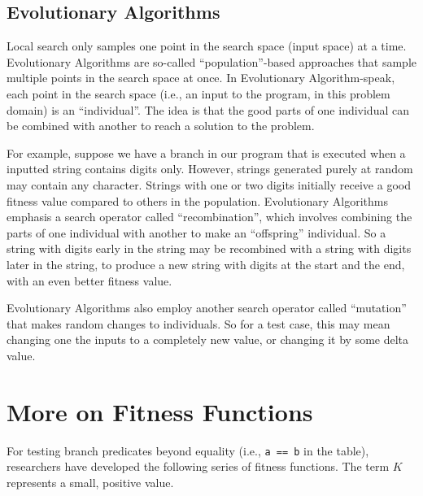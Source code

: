 \subsection{Evolutionary Algorithms}

Local search only samples one point in the search space (input space) at a time.
Evolutionary Algorithms are so-called ``population''-based approaches that
sample multiple points in the search space at once. In Evolutionary
Algorithm-speak, each point in the search space (i.e., an input to the program,
in this problem domain) is an ``individual''. The idea is that the good parts of
one individual can be combined with another to reach a solution to the problem. 

For example, suppose we have a branch in our program that is executed when a
inputted string contains digits only. However, strings generated purely at
random may contain any character. Strings with one or two digits initially
receive a good fitness value compared to others in the population. Evolutionary
Algorithms emphasis a search operator called ``recombination'', which involves
combining the parts of one individual with another to make an ``offspring''
individual. So a string with digits early in the string may be recombined with a
string with digits later in the string, to produce a new string with digits at
the start and the end, with an even better fitness value. 


Evolutionary Algorithms also employ another search operator called ``mutation''
that makes random changes to individuals. So for a test case, this may mean
changing one the inputs to a completely new value, or changing it by some delta
value. 


\section{More on Fitness Functions}

For testing branch predicates beyond equality (i.e., {\tt a == b} in the table),
researchers have developed the following series of fitness functions. The term
$K$ represents a small, positive value.

